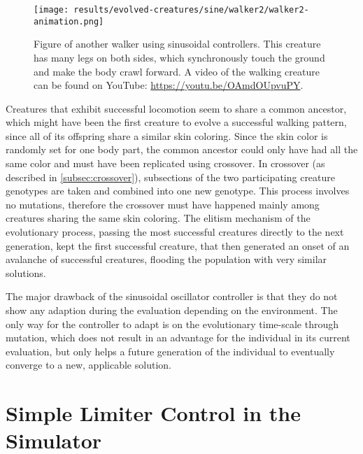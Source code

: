 \documentclass[main]{subfiles}
\begin{document}
\begin{figure}[tb]
\centering
\texttt{[image: results/evolved-creatures/sine/walker2/walker2-animation.png]}
\caption[Figure of another walker using sinusoidal controllers.]{Figure of another walker using sinusoidal controllers. This creature has many legs on both sides, which synchronously touch the ground and make the body crawl forward. A video of the walking creature can be found on YouTube: \url{https://youtu.be/OAmdOUpvuPY}.}
\label{figure:successfulcreatures-walker2}
\end{figure}

Creatures that exhibit successful locomotion seem to share a common ancestor, which might have been the first creature to evolve a successful walking pattern, since all of its offspring share a similar skin coloring. %
%
Since the skin color is randomly set for one body part, the common ancestor could only have had all the same color and must have been replicated using crossover. %
%
In crossover (as described in \ref{subsec:crossover}), subsections of the two participating creature genotypes are taken and combined into one new genotype. %
%
This process involves no mutations, therefore the crossover must have happened mainly among creatures sharing the same skin coloring. %
%
The elitism mechanism of the evolutionary process, passing the most successful creatures directly to the next generation, kept the first successful creature, that then generated an onset of an avalanche of successful creatures, flooding the population with very similar solutions. 

The major drawback of the sinusoidal oscillator controller is that they do not show any adaption during the evaluation depending on the environment. %
%
The only way for the controller to adapt is on the evolutionary time-scale through mutation, which does not result in an advantage for the individual in its current evaluation, but only helps a future generation of the individual to eventually converge to a new, applicable solution. 

\section{Simple Limiter Control in the Simulator}
\end{document}
